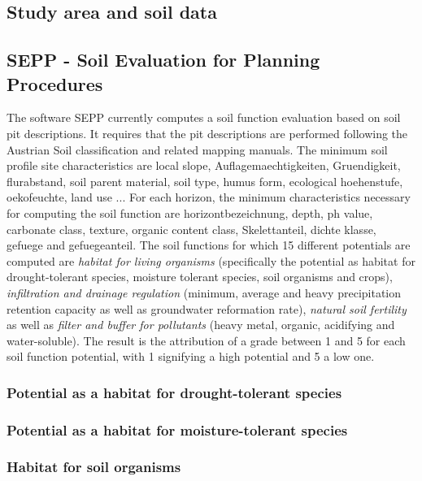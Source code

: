 \documentclass[preprint,12pt,authoryear]{elsarticle}
\begin{document}
\subsection{Study area and soil data}

\subsection{SEPP - Soil Evaluation for Planning Procedures}
The software SEPP currently computes a soil function evaluation based on soil pit descriptions. It requires that the pit descriptions are performed following the Austrian Soil classification  \citep{Nestroy2000,Nestroy2011} and related mapping manuals. The minimum  soil profile site characteristics are local slope, Auflagemaechtigkeiten, Gruendigkeit, flurabstand, soil parent material, soil type, humus form, ecological hoehenstufe, oekofeuchte, land use ... For each horizon, the minimum characteristics necessary for computing the soil function are horizontbezeichnung, depth, ph value, carbonate class, texture, organic content class, Skelettanteil, dichte klasse, gefuege and gefuegeanteil. The soil functions for which 15 different potentials are computed are  \emph{habitat for living organisms} (specifically the potential as habitat for drought-tolerant species, moisture tolerant species, soil organisms and crops),  \emph{infiltration and drainage regulation} (minimum, average and heavy precipitation retention capacity as well as groundwater reformation rate), \emph{natural soil fertility} as well as \emph{filter and buffer for pollutants} (heavy metal, organic, acidifying and water-soluble). The result is the attribution of a grade between 1 and 5 for each soil function potential, with 1 signifying a high potential and 5 a low one.

\subsubsection{Potential as a habitat for drought-tolerant species}

\subsubsection{Potential as a habitat for moisture-tolerant species}

\subsubsection{Habitat for soil organisms}
\end{document}
